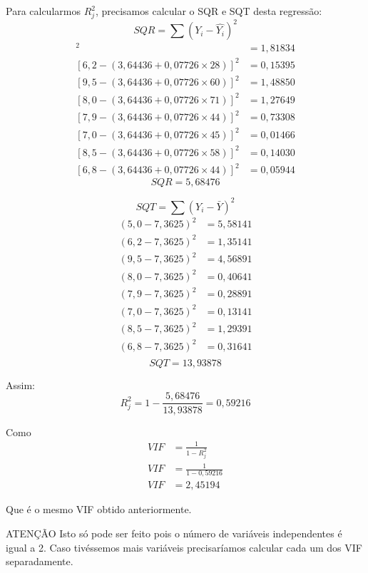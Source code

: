 \documentclass[]{ufpe-exercises}
\begin{document}
\begin{questions}
\begin{parts}
\begin{solution}
			Para calcularmos \(R^{2}_{j}\), precisamos calcular o SQR e SQT desta regressão:
			\[ SQR = \sum (Y_{i} - \hat{Y_{i}})^{2} \]
			\begin{align*}
				[5,0 - (3,64436 + 0,07726 \times 35)]^{2} & = 1,81834 \\
				[6,2 - (3,64436 + 0,07726 \times 28)]^{2} & = 0,15395 \\
				[9,5 - (3,64436 + 0,07726 \times 60)]^{2} & = 1,48850 \\
				[8,0 - (3,64436 + 0,07726 \times 71)]^{2} & = 1,27649 \\
				[7,9 - (3,64436 + 0,07726 \times 44)]^{2} & = 0,73308 \\
				[7,0 - (3,64436 + 0,07726 \times 45)]^{2} & = 0,01466 \\
				[8,5 - (3,64436 + 0,07726 \times 58)]^{2} & = 0,14030 \\
				[6,8 - (3,64436 + 0,07726 \times 44)]^{2} & = 0,05944
			\end{align*}
			\[ SQR = 5,68476\]

			\[ SQT = \sum (Y_{i} - \bar{Y})^{2}\]
			\begin{align*}
				(5,0 - 7,3625)^{2} & = 5,58141 \\
				(6,2 - 7,3625)^{2} & = 1,35141 \\
				(9,5 - 7,3625)^{2} & = 4,56891 \\
				(8,0 - 7,3625)^{2} & = 0,40641 \\
				(7,9 - 7,3625)^{2} & = 0,28891 \\
				(7,0 - 7,3625)^{2} & = 0,13141 \\
				(8,5 - 7,3625)^{2} & = 1,29391 \\
				(6,8 - 7,3625)^{2} & = 0,31641 \\
			\end{align*}
			\[ SQT = 13,93878\]

			Assim:
			\[ R^{2}_{j} = 1 - \frac{5,68476}{13,93878} = 0,59216\]

			Como
			\begin{align*}
				VIF & = \frac{1}{1 - R^{2}_{j}} \\
				VIF & = \frac{1}{1 - 0,59216}   \\
				VIF & = 2,45194
			\end{align*}

			Que é  o mesmo VIF obtido anteriormente.

			\begin{myalert}{ATENÇÃO}
				Isto só pode ser feito pois o número de variáveis independentes é igual a 2. Caso tivéssemos mais variáveis precisaríamos calcular cada um dos VIF separadamente.
			\end{myalert}
		\end{solution}


\end{parts}
\end{questions}
\end{document}
